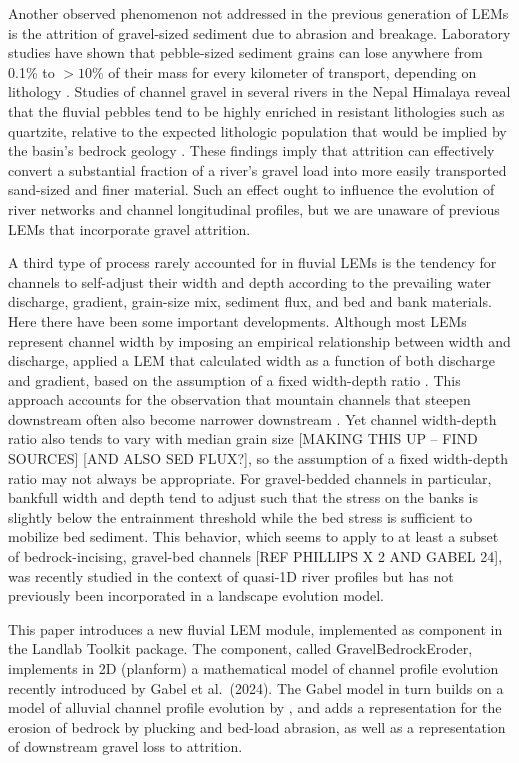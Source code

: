 \documentclass[journal abbreviation, manuscript]{copernicus}
\begin{document}
Another observed phenomenon not addressed in the previous generation of LEMs is the attrition of gravel-sized sediment due to abrasion and breakage. Laboratory studies have shown that pebble-sized sediment grains can lose anywhere from 0.1\% to $>10$\% of their mass for every kilometer of transport, depending on lithology \citep{attal2009pebble}. Studies of channel gravel in several rivers in the Nepal Himalaya reveal that the fluvial pebbles tend to be highly enriched in resistant lithologies such as quartzite, relative to the expected lithologic population that would be implied by the basin's bedrock geology \citep{attal2006changes,dingle2017}. These findings imply that attrition can effectively convert a substantial fraction of a river's gravel load into more easily transported sand-sized and finer material. Such an effect ought to influence the evolution of river networks and channel longitudinal profiles, but we are unaware of previous LEMs that incorporate gravel attrition.

A third type of process rarely accounted for in fluvial LEMs is the tendency for channels to self-adjust their width and depth according to the prevailing water discharge, gradient, grain-size mix, sediment flux, and bed and bank materials. Here there have been some important developments. Although most LEMs represent channel width by imposing an empirical relationship between width and discharge,  \citet{attal2008modeling} applied a LEM that calculated width as a function of both discharge and gradient, based on the assumption of a fixed width-depth ratio  \citep{finnegan2005}. This approach accounts for the observation that mountain channels that steepen downstream often also become narrower downstream \citep[e.g.,][]{lave2001fluvial,whittaker2007bedrock}. Yet channel width-depth ratio also tends to vary with median grain size [MAKING THIS UP -- FIND SOURCES] [AND ALSO SED FLUX?], so the assumption of a fixed width-depth ratio may not always be appropriate. For gravel-bedded channels in particular, bankfull width and depth tend to adjust such that the stress on the banks is slightly below the entrainment threshold while the bed stress is sufficient to mobilize bed sediment. This behavior, which seems to apply to at least a subset of bedrock-incising, gravel-bed channels [REF PHILLIPS X 2 AND GABEL 24], was recently studied in the context of quasi-1D river profiles but has not previously been incorporated in a landscape evolution model.

This paper introduces a new fluvial LEM module, implemented as component in the Landlab Toolkit package. The component, called GravelBedrockEroder, implements in 2D (planform) a mathematical model of channel profile evolution recently introduced by Gabel et al.~(2024). The Gabel model in turn builds on a model of alluvial channel profile evolution by \citet{wickert}, and adds a representation for the erosion of bedrock by plucking and bed-load abrasion, as well as a representation of downstream gravel loss to attrition.
\end{document}
